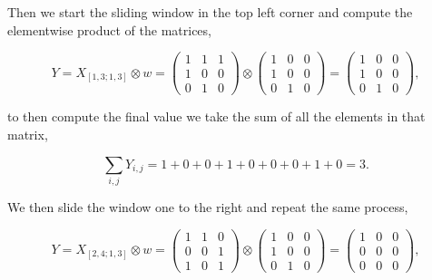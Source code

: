 \begin{description}
        Then we start the sliding window in the top left corner and compute the
        elementwise product of the matrices,

        \begin{equation}
            Y = X_{[1,3;1,3]} \otimes w =
            \begin{pmatrix}
                1 & 1 & 1 \\
                1 & 0 & 0 \\
                0 & 1 & 0
            \end{pmatrix} \otimes
            \begin{pmatrix}
                1 & 0 & 0 \\
                1 & 0 & 0 \\
                0 & 1 & 0
            \end{pmatrix} =
            \begin{pmatrix}
                1 & 0 & 0 \\
                1 & 0 & 0 \\
                0 & 1 & 0
            \end{pmatrix},
        \end{equation}

        to then compute the final value we take the sum of all the elements in
        that matrix,

        \begin{equation}
            \sum_{i,j} Y_{i,j} = 1 + 0 + 0 + 1 + 0 + 0 + 0 + 1 + 0 = 3.
        \end{equation}

        We then slide the window one to the right and repeat the same process,

        \begin{equation}
            Y = X_{[2,4;1,3]} \otimes w =
            \begin{pmatrix}
                1 & 1 & 0 \\
                0 & 0 & 1 \\
                1 & 0 & 1
            \end{pmatrix} \otimes
            \begin{pmatrix}
                1 & 0 & 0 \\
                1 & 0 & 0 \\
                0 & 1 & 0
            \end{pmatrix} =
            \begin{pmatrix}
                1 & 0 & 0 \\
                0 & 0 & 0 \\
                0 & 0 & 0
            \end{pmatrix},
        \end{equation}


\end{description}
